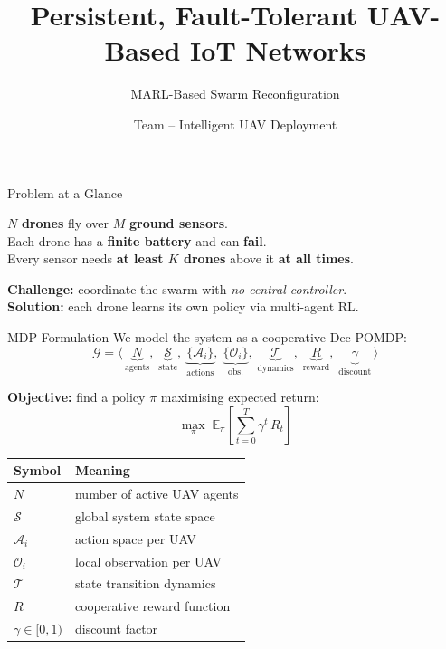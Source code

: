 \documentclass[aspectratio=169,12pt]{beamer}
\title[Fault-Tolerant UAV Networks]
{Persistent, Fault-Tolerant UAV-Based IoT Networks}
\subtitle{MARL-Based Swarm Reconfiguration}
\author{Team -- Intelligent UAV Deployment}
\institute{IIT Dharwad}
\date{}
\begin{document}
\begin{frame}
    \titlepage
\end{frame}

\begin{frame}{Problem at a Glance}
\begin{center}
\large
$N$ \textbf{drones} fly over $M$ \textbf{ground sensors}.\\[0.4em]
Each drone has a \textbf{finite battery} and can \textbf{fail}.\\[0.4em]
Every sensor needs \textbf{at least $K$ drones} above it \textbf{at all times}.
\end{center}

\vspace{0.6em}
\textbf{Challenge:} coordinate the swarm with \emph{no central controller}.\\
\textbf{Solution:} each drone learns its own policy via multi-agent RL.
\end{frame}

\begin{frame}{MDP Formulation}
We model the system as a cooperative Dec-POMDP:
\[
\mathcal{G} = \bigl\langle\,
  \underbrace{N}_{\text{agents}},\;
  \underbrace{\mathcal{S}}_{\text{state}},\;
  \underbrace{\{\mathcal{A}_i\}}_{\text{actions}},\;
  \underbrace{\{\mathcal{O}_i\}}_{\text{obs.}},\;
  \underbrace{\mathcal{T}}_{\text{dynamics}},\;
  \underbrace{R}_{\text{reward}},\;
  \underbrace{\gamma}_{\text{discount}}
\,\bigr\rangle
\]

\vspace{0.3em}
\textbf{Objective:} find a policy $\pi$ maximising expected return:
\[
\max_{\pi}\;
\mathbb{E}_{\pi}
\!\left[
  \sum_{t=0}^{T} \gamma^{t}\, R_t
\right]
\]

\vspace{0.3em}
\begin{tabular}{@{}ll@{}}
\toprule
\textbf{Symbol} & \textbf{Meaning} \\
\midrule
$N$ & number of active UAV agents \\
$\mathcal{S}$ & global system state space \\
$\mathcal{A}_i$ & action space per UAV \\
$\mathcal{O}_i$ & local observation per UAV \\
$\mathcal{T}$ & state transition dynamics \\
$R$ & cooperative reward function \\
$\gamma \in [0,1)$ & discount factor \\
\bottomrule
\end{tabular}
\end{frame}
\end{document}
